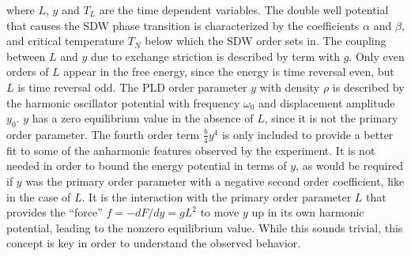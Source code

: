 where $L$, $y$ and $T_L$ are the time dependent variables.
The double well potential that causes the SDW phase transition is characterized by the coefficients $\alpha$ and $\beta$,  and critical temperature $T_N$ below which the SDW order sets in.
The coupling between $L$ and $y$ due to exchange striction is described by term with $g$.
Only even orders of $L$ appear in the free energy, since the energy is time reversal even, but $L$ is time reversal odd.
The PLD order parameter $y$ with density $\rho$ is described by the harmonic oscillator potential with frequency $\omega_0$ and displacement amplitude $y_0$.
$y$ has a zero equilibrium value in the absence of $L$, since it is not the primary order parameter.
The fourth order term $\frac{b}{4}y^4$ is only included to provide a better fit to some of the anharmonic features observed by the experiment.
It is not needed in order to bound the energy potential in terms of $y$, as would be required if $y$ was the primary order parameter with a negative second order coefficient, like in the case of $L$.
It is the interaction with the primary order parameter $L$ that provides the ``force'' $f = -dF/dy = gL^2$ to move $y$ up in its own harmonic potential, leading to the nonzero equilibrium value.
While this sounds trivial, this concept is key in order to understand the observed behavior.

